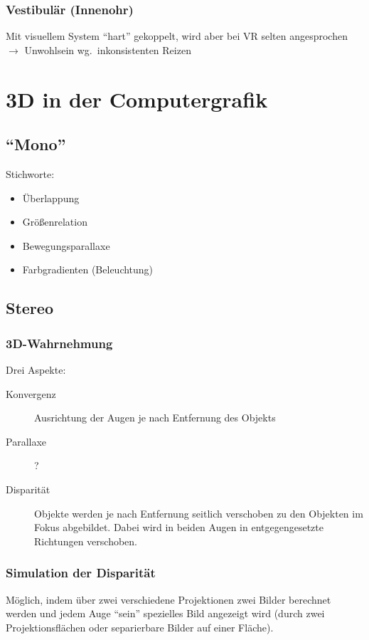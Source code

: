 \documentclass[a4paper, 12pt]{article}
\begin{document}
\subsubsection*{Vestibulär (Innenohr)}
Mit visuellem System ``hart'' gekoppelt, wird aber bei VR selten angesprochen\\
\(\rightarrow\) Unwohlsein wg.\ inkonsistenten Reizen



\section{3D in der Computergrafik}


\subsection{``Mono''}
Stichworte:
\begin{itemize}
  \item Überlappung
  \item Größenrelation
  \item Bewegungsparallaxe
  \item Farbgradienten (Beleuchtung)
\end{itemize}


\subsection{Stereo}

\subsubsection*{3D-Wahrnehmung}
Drei Aspekte:
\begin{description}
  \item[Konvergenz] Ausrichtung der Augen je nach Entfernung des Objekts
  \item[Parallaxe] ?
  \item[Disparität] Objekte werden je nach Entfernung seitlich verschoben zu den Objekten im Fokus abgebildet.
    Dabei wird in beiden Augen in entgegengesetzte Richtungen verschoben.
\end{description}

\subsubsection*{Simulation der Disparität}
Möglich, indem über zwei verschiedene Projektionen zwei Bilder berechnet werden und jedem Auge ``sein'' spezielles Bild angezeigt wird (durch zwei Projektionsflächen oder separierbare Bilder auf einer Fläche).
\end{document}
